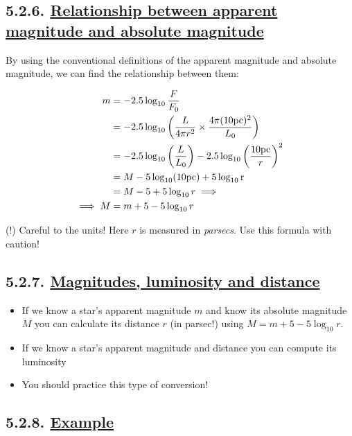\documentclass[
  letterpaper,
  DIV=11,
  numbers=noendperiod]{scrreprt}
\providecommand{\tightlist}{%
  \setlength{\itemsep}{0pt}\setlength{\parskip}{0pt}}\usepackage{longtable,booktabs,array}
\begin{document}
\hypertarget{relationship-between-apparent-magnitude-and-absolute-magnitude}{%
\subsection{\texorpdfstring{5.2.6.
\protect\hyperlink{toc0_}{Relationship between apparent magnitude and
absolute
magnitude}}{5.2.6. Relationship between apparent magnitude and absolute magnitude}}\label{relationship-between-apparent-magnitude-and-absolute-magnitude}}

By using the conventional definitions of the apparent magnitude and
absolute magnitude, we can find the relationship between them:

\begin{align}
m &= -2.5\log_{10}{\frac{F}{F_0}} \\
&= -2.5\log_{10}\left(\frac{L}{4\pi r^2}\times \frac{4\pi (10\rm{pc})^2}{L_0} \right) \\
& =-2.5\log_{10}\left(\frac{L}{L_0}\right) -2.5\log_{10} \left( \frac{10\rm{pc}}{r}\right)^2\\
& = M -5\log_{10}(10\rm{pc})+5\log_{10}{r}\\
& = M -5 + 5\log_{10}{r} \implies \\
\implies M &= m + 5 - 5\log_{10} r
\end{align}

(!) Careful to the units! Here \(r\) is measured in \emph{parsecs}. Use
this formula with caution!

\hypertarget{magnitudes-luminosity-and-distance}{%
\subsection{\texorpdfstring{5.2.7. \protect\hyperlink{toc0_}{Magnitudes,
luminosity and
distance}}{5.2.7. Magnitudes, luminosity and distance}}\label{magnitudes-luminosity-and-distance}}

\begin{itemize}
\tightlist
\item
  If we know a star's apparent magnitude \(m\) and know its absolute
  magnitude \(M\) you can calculate its distance \(r\) (in parsec!)
  using \(M=m + 5 - 5\log_{10} r\).
\item
  If we know a star's apparent magnitude and distance you can compute
  its luminosity
\item
  You should practice this type of conversion!
\end{itemize}

\hypertarget{example-1}{%
\subsection{\texorpdfstring{5.2.8.
\protect\hyperlink{toc0_}{Example}}{5.2.8. Example}}\label{example-1}}
\end{document}
